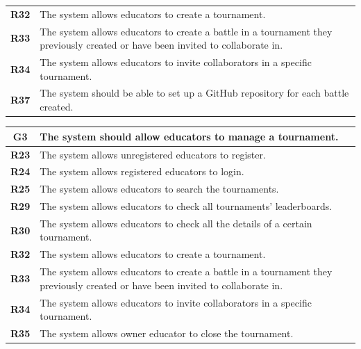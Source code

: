 \documentclass[12pt, a4paper]{report}
\begin{document}
\begin{table}[H]
\begin{tabularx}{\textwidth}{cX}
        \textbf{R32} & The system allows educators to create a tournament.                              \\
        \textbf{R33} & The system allows educators to create a battle in a tournament they
                        previously created or have been invited to collaborate in.\\
        \textbf{R34} & The system allows educators to invite collaborators in a specific tournament.    \\
        \textbf{R37} & The system should be able to set up a GitHub repository for each battle
                        created.\\                                              
        \end{tabularx}
    \end{table}

    \begin{table}[H]
        \begin{tabularx}{\textwidth}{cX}
        \textbf{G3} & The system should allow educators to manage a tournament.                         \\
        \hline
        \textbf{R23} & The system allows unregistered educators to register. \\
        \textbf{R24} & The system allows registered educators to login. \\
        \textbf{R25} & The system allows educators to search the tournaments. \\
        \textbf{R29} & The system allows educators to check all tournaments’ leaderboards. \\
        \textbf{R30} & The system allows educators to check all the details of a certain tournament.\\
        \textbf{R32} & The system allows educators to create a tournament.\\
        \textbf{R33} & The system allows educators to create a battle in a tournament they previously created or have been invited to collaborate in.\\
        \textbf{R34} & The system allows educators to invite collaborators in a specific tournament.\\
        \textbf{R35} & The system allows owner educator to close the tournament. \\
    \end{tabularx}
    \end{table}
\end{document}
